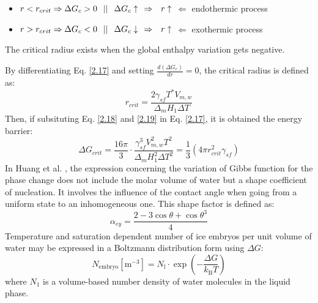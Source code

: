 \begin{itemize}
	\item $r < r_{crit} \Rightarrow \Delta G_{c} > 0 \hspace{0.25cm} || \hspace{0.25cm} \Delta G_{c} \uparrow \hspace{0.25cm} \Rightarrow \hspace{0.25cm} r \uparrow $ $\Leftarrow$ endothermic process
	\item $r > r_{crit} \Rightarrow \Delta G_{c} < 0 \hspace{0.25cm} || \hspace{0.25cm} \Delta G_{c} \downarrow \hspace{0.25cm} \Rightarrow \hspace{0.25cm} r \uparrow $ $\Leftarrow$ exothermic process
\end{itemize}
The critical radius exists when the global enthalpy variation gets negative.

\noindent By differentiating Eq. \ref{2.17} and setting $\frac{d(\Delta G_c)}{dr} = 0$, the critical radius is defined as:
\begin{equation}
	\label{2.19}
	r_{c r i t}=\frac{2 \gamma_{s f} T^{*} V_{m, w}}{\Delta_{m} H_{1} \Delta T}
\end{equation}
Then, if subsituting Eq. \ref{2.18} and \ref{2.19} in Eq. \ref{2.17}, it is obtained the energy barrier:
\begin{equation}
	\label{2.20}
	\Delta G_{c r i t}=\frac{16 \pi}{3} \cdot \frac{\gamma_{s f}^{3} V_{m, w}^{2} T^{2}}{\Delta_{m} H_{1}^{2} \Delta T^{2}}=\frac{1}{3}\left(4 \pi r_{c r i t}^{2} \gamma_{s f}\right)
\end{equation}
In Huang et al. \cite{huang_wang_li_2020}, the expression concerning the variation of Gibbs function for the phase change does not include the molar volume of water but a shape coefficient of nucleation. It involves the influence of the contact angle when going from a uniform state to an inhomogeneous one. This shape factor is defined as:
\begin{equation}
	\label{2.21}
	\alpha_{e y}=\frac{2-3 \cos \theta+\cos \theta^{3}}{4}
\end{equation}
Temperature and saturation dependent number of ice embryos per unit volume of water may be expressed in a Boltzmann distribution form using $\Delta G$:
\begin{equation}
	\label{2.22}
	N_{\mathrm{embryo}}\left[\mathrm{m}^{-3}\right]=N_{\mathrm{l}} \cdot \exp \left(-\frac{\Delta G}{k_{\mathrm{B}} T}\right)
\end{equation}
where $N_{1}$ is a volume-based number density of water molecules in the liquid phase.


